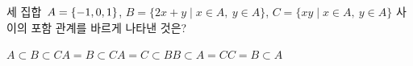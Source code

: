 세 집합~$A=\{-1{,}\mkern3mu\mathopen{}0{,}\mkern3mu\mathopen{}1\}$, $B=\{2x+y \mid x\in A,\ y\in A\}$, $C=\{xy \mid x\in A,\ y\in A\}$ 사이의 포함 관계를 바르게 나타낸 것은?
\begin{choices32}{$A\subset B\subset C$}{$A=B\subset C$}{$A=C\subset B$}{$B\subset A=C$}{$C=B\subset A$}\end{choices32}
